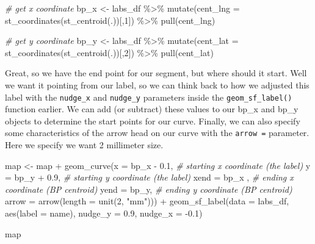 \documentclass[
  krantz2]{krantz}
\makeatletter
\newenvironment{Shaded}{\begin{snugshade}}{\end{snugshade}}
\newcommand{\AttributeTok}[1]{\textcolor[rgb]{0.61,0.61,0.61}{#1}}
\newcommand{\CommentTok}[1]{\textcolor[rgb]{0.37,0.37,0.37}{\textit{#1}}}
\newcommand{\DecValTok}[1]{\textcolor[rgb]{0.06,0.06,0.06}{#1}}
\newcommand{\FloatTok}[1]{\textcolor[rgb]{0.06,0.06,0.06}{#1}}
\newcommand{\FunctionTok}[1]{\textcolor[rgb]{0,0,0}{#1}}
\newcommand{\NormalTok}[1]{#1}
\newcommand{\OtherTok}[1]{\textcolor[rgb]{0.37,0.37,0.37}{#1}}
\newcommand{\SpecialCharTok}[1]{\textcolor[rgb]{0,0,0}{#1}}
\newcommand{\StringTok}[1]{\textcolor[rgb]{0.5,0.5,0.5}{#1}}
\newenvironment{kframe}{%
\medskip{}
\setlength{\fboxsep}{.8em}
 \def\at@end@of@kframe{}%
 \ifinner\ifhmode%
  \def\at@end@of@kframe{\end{minipage}}%
  \begin{minipage}{\columnwidth}%
 \fi\fi%
 \def\FrameCommand##1{\hskip\@totalleftmargin \hskip-\fboxsep
 \colorbox{shadecolor}{##1}\hskip-\fboxsep
     \hskip-\linewidth \hskip-\@totalleftmargin \hskip\columnwidth}%
 \MakeFramed {\advance\hsize-\width
   \@totalleftmargin\z@ \linewidth\hsize
   \@setminipage}}%
 {\par\unskip\endMakeFramed%
 \at@end@of@kframe}
\renewenvironment{Shaded}{\begin{kframe}}{\end{kframe}}
\makeatother
\begin{document}
\begin{Shaded}
\begin{Highlighting}[]
\CommentTok{\# get x coordinate}
\NormalTok{bp\_x }\OtherTok{\textless{}{-}}\NormalTok{ labs\_df }\SpecialCharTok{\%\textgreater{}\%} 
  \FunctionTok{mutate}\NormalTok{(}\AttributeTok{cent\_lng =} \FunctionTok{st\_coordinates}\NormalTok{(}\FunctionTok{st\_centroid}\NormalTok{(.))[,}\DecValTok{1}\NormalTok{]) }\SpecialCharTok{\%\textgreater{}\%} 
  \FunctionTok{pull}\NormalTok{(cent\_lng)}

\CommentTok{\# get y coordinate}
\NormalTok{bp\_y }\OtherTok{\textless{}{-}}\NormalTok{ labs\_df }\SpecialCharTok{\%\textgreater{}\%} 
  \FunctionTok{mutate}\NormalTok{(}\AttributeTok{cent\_lat =} \FunctionTok{st\_coordinates}\NormalTok{(}\FunctionTok{st\_centroid}\NormalTok{(.))[,}\DecValTok{2}\NormalTok{]) }\SpecialCharTok{\%\textgreater{}\%} 
  \FunctionTok{pull}\NormalTok{(cent\_lat)}
\end{Highlighting}
\end{Shaded}

Great, so we have the end point for our segment, but where should it start. Well we want it pointing from our label, so we can think back to how we adjusted this label with the \texttt{nudge\_x} and \texttt{nudge\_y} parameters inside the \texttt{geom\_sf\_label()} function earlier. We can add (or subtract) these values to our bp\_x and bp\_y objects to determine the start points for our curve. Finally, we can also specify some characteristics of the arrow head on our curve with the \texttt{arrow\ =} parameter. Here we specify we want 2 millimeter size.

\begin{Shaded}
\begin{Highlighting}[]
\NormalTok{map }\OtherTok{\textless{}{-}}\NormalTok{ map }\SpecialCharTok{+} 
  \FunctionTok{geom\_curve}\NormalTok{(}\AttributeTok{x =}\NormalTok{ bp\_x }\SpecialCharTok{{-}} \FloatTok{0.1}\NormalTok{,  }\CommentTok{\# starting x coordinate (the label)}
             \AttributeTok{y =}\NormalTok{ bp\_y }\SpecialCharTok{+} \FloatTok{0.9}\NormalTok{, }\CommentTok{\# starting y coordinate (the label)}
             \AttributeTok{xend =}\NormalTok{ bp\_x , }\CommentTok{\# ending x coordinate (BP centroid)}
             \AttributeTok{yend =}\NormalTok{ bp\_y,  }\CommentTok{\# ending y coordinate (BP centroid)}
             \AttributeTok{arrow =} \FunctionTok{arrow}\NormalTok{(}\AttributeTok{length =} \FunctionTok{unit}\NormalTok{(}\DecValTok{2}\NormalTok{, }\StringTok{"mm"}\NormalTok{))) }\SpecialCharTok{+}
  \FunctionTok{geom\_sf\_label}\NormalTok{(}\AttributeTok{data =}\NormalTok{ labs\_df, }
                \FunctionTok{aes}\NormalTok{(}\AttributeTok{label =}\NormalTok{ name), }
                \AttributeTok{nudge\_y =} \FloatTok{0.9}\NormalTok{, }
                \AttributeTok{nudge\_x =} \SpecialCharTok{{-}}\FloatTok{0.1}\NormalTok{) }

\NormalTok{map}
\end{Highlighting}
\end{Shaded}
\end{document}
